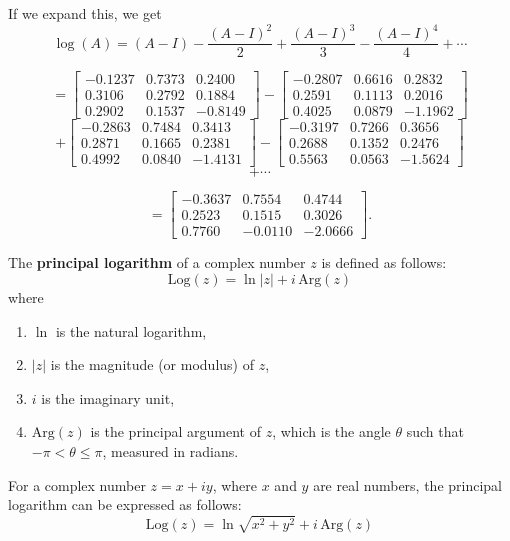 \begin{definition}
\begin{example}
If we expand this, we get
\[
\log(A)= (A-I) - \frac{(A-I)^{2}}{2} + \frac{(A-I)^{3}}{3} - \frac{(A-I)^{4}}{4} + \cdots
\]



\[=
\begin{bmatrix}
   -0.1237 & 0.7373 & 0.2400 \\
    0.3106 & 0.2792 & 0.1884 \\
    0.2902 & 0.1537 & -0.8149
\end{bmatrix} - \begin{bmatrix}
   -0.2807 & 0.6616 & 0.2832 \\
    0.2591 & 0.1113 & 0.2016 \\
    0.4025 & 0.0879 & -1.1962
\end{bmatrix}
\] \[ +
\begin{bmatrix}
   -0.2863 & 0.7484 & 0.3413 \\
    0.2871 & 0.1665 & 0.2381 \\
    0.4992 & 0.0840 & -1.4131
\end{bmatrix} - \begin{bmatrix}
   -0.3197 & 0.7266 & 0.3656 \\
    0.2688 & 0.1352 & 0.2476 \\
    0.5563 & 0.0563 & -1.5624
\end{bmatrix}
\] \[+\cdots \]


\[=
\begin{bmatrix}
   -0.3637 & 0.7554 & 0.4744 \\
    0.2523 & 0.1515 & 0.3026 \\
    0.7760 & -0.0110 & -2.0666
\end{bmatrix}.
\]


\end{example}

\begin{definition}
The \textbf{principal logarithm} of a complex number $z$ is defined as follows:
\[
\text{Log}(z) = \ln|z| + i \, \text{Arg}(z)
\]
where
\begin{enumerate}
  \item $\ln$ is the natural logarithm,
  \item $|z|$ is the magnitude (or modulus) of $z$,
  \item $i$ is the imaginary unit,
  \item $\text{Arg}(z)$ is the principal argument of $z$, which is the angle $\theta$ such that $-\pi < \theta \leq \pi$, measured in radians.
\end{enumerate}
\end{definition}

\begin{example}
    For a complex number $z = x + iy$, where $x$ and $y$ are real numbers, the principal logarithm can be expressed as follows:
\[
\text{Log}(z) = \ln \sqrt{x^2 + y^2} + i \, \text{Arg}(z)
\]
\end{example}
\end{definition}


